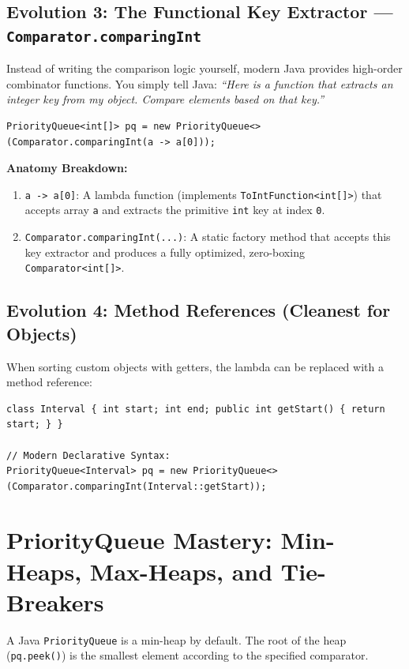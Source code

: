 \documentclass[10pt,journal,compsoc,onecolumn]{IEEEtran}
\begin{document}
\subsection{Evolution 3: The Functional Key Extractor --- \texttt{Comparator.comparingInt}}
Instead of writing the comparison logic yourself, modern Java provides high-order combinator functions. You simply tell Java: \emph{``Here is a function that extracts an integer key from my object. Compare elements based on that key.''}
\begin{verbatim}
PriorityQueue<int[]> pq = new PriorityQueue<>(Comparator.comparingInt(a -> a[0]));
\end{verbatim}
\textbf{Anatomy Breakdown:}
\begin{enumerate}
    \item \texttt{a -> a[0]}: A lambda function (implements \texttt{ToIntFunction<int[]>}) that accepts array \texttt{a} and extracts the primitive \texttt{int} key at index \texttt{0}.
    \item \texttt{Comparator.comparingInt(...)}: A static factory method that accepts this key extractor and produces a fully optimized, zero-boxing \texttt{Comparator<int[]>}.
\end{enumerate}

\subsection{Evolution 4: Method References (Cleanest for Objects)}
When sorting custom objects with getters, the lambda can be replaced with a method reference:
\begin{verbatim}
class Interval { int start; int end; public int getStart() { return start; } }

// Modern Declarative Syntax:
PriorityQueue<Interval> pq = new PriorityQueue<>(Comparator.comparingInt(Interval::getStart));
\end{verbatim}

\section{PriorityQueue Mastery: Min-Heaps, Max-Heaps, and Tie-Breakers}
\label{sec:priority_queue}

A Java \texttt{PriorityQueue} is a min-heap by default. The root of the heap (\texttt{pq.peek()}) is the smallest element according to the specified comparator.
\end{document}
